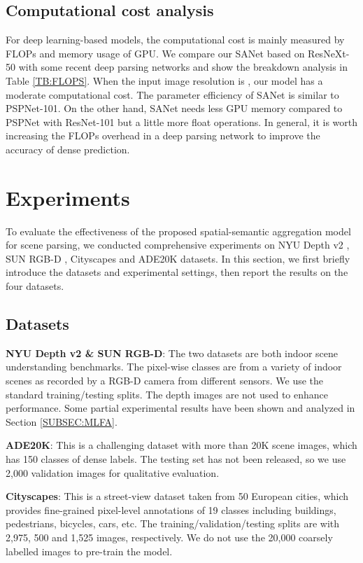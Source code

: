 \documentclass[10pt,twocolumn,twoside]{IEEEtran}
\begin{document}
\subsection{Computational cost analysis}
 
For deep learning-based models, the computational cost is mainly measured by FLOPs and memory usage of GPU. We compare our SANet based on ResNeXt-50 with some recent deep parsing networks and show the breakdown analysis in Table \ref{TB:FLOPS}. When the input image resolution is , our model has a moderate computational cost. The parameter efficiency of SANet is similar to PSPNet-101. On the other hand, SANet needs less GPU memory compared to PSPNet with ResNet-101 but a little more float operations. In general, it is worth increasing the FLOPs overhead in a deep parsing network to improve the accuracy of dense prediction.

\section{Experiments}\label{SEC:EXP}

To evaluate the effectiveness of the proposed spatial-semantic aggregation model for scene parsing, we conducted comprehensive experiments on NYU Depth v2 \cite{ECCV12:NYU}, SUN RGB-D \cite{NIPS14:SUN}, Cityscapes \cite{CVPR16:CITYSCAPES} and ADE20K \cite{CVPR17:ADE20K} datasets. In this section, we first briefly introduce the datasets and experimental settings, then report the results on the four datasets.

\subsection{Datasets}

{\bf NYU Depth v2 \& SUN RGB-D}: The two datasets are both indoor scene understanding benchmarks. The pixel-wise classes are from a variety of indoor scenes as recorded by a RGB-D camera from different sensors. We use the standard training/testing splits. The depth images are not used to enhance performance. Some partial experimental results have been shown and analyzed in Section \ref{SUBSEC:MLFA}.

{\bf ADE20K}: This is a challenging dataset with more than 20K scene images, which has 150 classes of dense labels. The testing set has not been released, so we use 2,000 validation images for qualitative evaluation.

{\bf Cityscapes}: This is a street-view dataset taken from 50 European cities, which provides fine-grained pixel-level annotations of 19 classes including buildings, pedestrians, bicycles, cars, etc. The training/validation/testing splits are with 2,975, 500 and 1,525 images, respectively. We do not use the 20,000 coarsely labelled images to pre-train the model.
\end{document}
